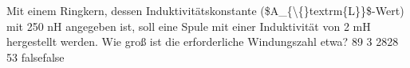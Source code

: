     {Mit einem Ringkern, dessen Induktivitätskonstante (\$A\_\{\textbackslash\{\}textrm\{L\}\}\$-Wert) mit 250 nH angegeben ist, soll eine Spule mit einer Induktivität von 2 mH hergestellt werden. Wie groß ist die erforderliche Windungszahl etwa?}
    {89}
    {3}
    {2828}
    {53}
    {false}{false}
